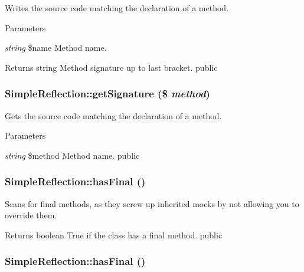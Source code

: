 \label{class_simple_reflection_a6145a1e4b2502359151d62f044b86f25}
Writes the source code matching the declaration of a method. 
\begin{DoxyParams}{Parameters}
\item[{\em string}]\$name Method name. \end{DoxyParams}
\begin{DoxyReturn}{Returns}
string Method signature up to last bracket.  public 
\end{DoxyReturn}
\hypertarget{class_simple_reflection_ae6dc2324932e5bf70ecaff5a57893b5b}{
\subsubsection[{getSignature}]{\setlength{\rightskip}{0pt plus 5cm}SimpleReflection::getSignature (\$ {\em method})}}
\label{class_simple_reflection_ae6dc2324932e5bf70ecaff5a57893b5b}
Gets the source code matching the declaration of a method. 
\begin{DoxyParams}{Parameters}
\item[{\em string}]\$method Method name.  public \end{DoxyParams}
\hypertarget{class_simple_reflection_a643ff5d07c0c1e6d24a6c7fad36da9af}{
\subsubsection[{hasFinal}]{\setlength{\rightskip}{0pt plus 5cm}SimpleReflection::hasFinal ()}}
\label{class_simple_reflection_a643ff5d07c0c1e6d24a6c7fad36da9af}
Scans for final methods, as they screw up inherited mocks by not allowing you to override them. \begin{DoxyReturn}{Returns}
boolean True if the class has a final method.  public 
\end{DoxyReturn}
\hypertarget{class_simple_reflection_a643ff5d07c0c1e6d24a6c7fad36da9af}{
\subsubsection[{hasFinal}]{\setlength{\rightskip}{0pt plus 5cm}SimpleReflection::hasFinal ()}}
